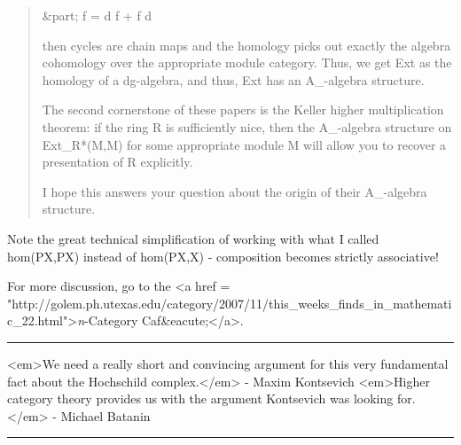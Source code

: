 \begin{quote}
   &part; f = d f + f d

   then cycles are chain maps and the homology picks out exactly the
   algebra cohomology over the appropriate module category. Thus, we 
   get Ext as the homology of a dg-algebra, and thus, Ext has an
   A_{\infty }-algebra structure.

   The second cornerstone of these papers is the Keller higher
   multiplication theorem: if the ring R is sufficiently nice, then 
   the A_{\infty }-algebra structure on Ext_{R}*(M,M) for some 
   appropriate module M will allow you to recover a presentation of 
   R explicitly.

   I hope this answers your question about the origin of their
   A_{\infty }-algebra structure.
\end{quote}

Note the great technical simplification of working with what 
I called hom(PX,PX) instead of hom(PX,X) - composition becomes
strictly associative!



For more discussion, go to the
<a href = "http://golem.ph.utexas.edu/category/2007/11/this_weeks_finds_in_mathematic_22.html">\emph{n}-Category Caf&eacute;</a>.

\par\noindent\rule{\textwidth}{0.4pt}
<em>We need a really short and convincing argument for this very 
fundamental fact about the Hochschild complex.</em> - Maxim Kontsevich
<em>Higher category theory provides us with the argument Kontsevich
was looking for.</em> - Michael Batanin

\par\noindent\rule{\textwidth}{0.4pt}

